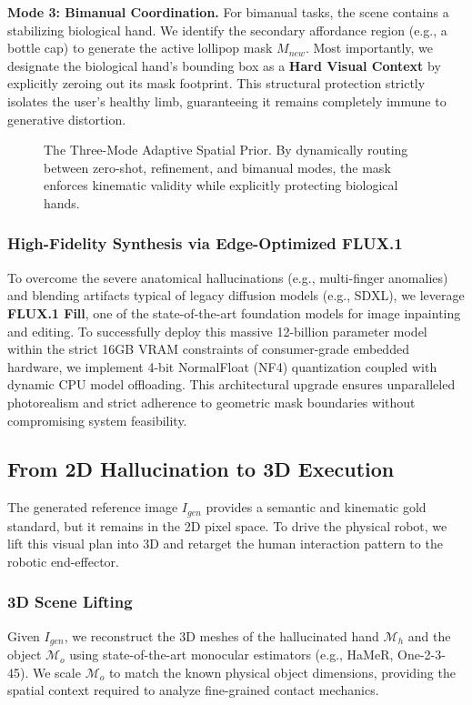 \documentclass[letterpaper, 10 pt, conference]{ieeeconf}  %
\begin{document}
\textbf{Mode 3: Bimanual Coordination.} 
For bimanual tasks, the scene contains a stabilizing biological hand. We identify the secondary affordance region (e.g., a bottle cap) to generate the active lollipop mask $M_{new}$. Most importantly, we designate the biological hand's bounding box as a \textbf{Hard Visual Context} by explicitly zeroing out its mask footprint. This structural protection strictly isolates the user's healthy limb, guaranteeing it remains completely immune to generative distortion.

\begin{figure}[t]
    \centering
    \caption{The Three-Mode Adaptive Spatial Prior. By dynamically routing between zero-shot, refinement, and bimanual modes, the mask enforces kinematic validity while explicitly protecting biological hands.}
    \label{fig:mask_generation}
\end{figure}

\subsubsection{High-Fidelity Synthesis via Edge-Optimized FLUX.1}
To overcome the severe anatomical hallucinations (e.g., multi-finger anomalies) and blending artifacts typical of legacy diffusion models (e.g., SDXL), we leverage \textbf{FLUX.1 Fill}, one of the state-of-the-art foundation models for image inpainting and editing. To successfully deploy this massive 12-billion parameter model within the strict 16GB VRAM constraints of consumer-grade embedded hardware, we implement 4-bit NormalFloat (NF4) quantization coupled with dynamic CPU model offloading. This architectural upgrade ensures unparalleled photorealism and strict adherence to geometric mask boundaries without compromising system feasibility.

\subsection{From 2D Hallucination to 3D Execution}
\label{subsec:retargeting}

The generated reference image $I_{gen}$ provides a semantic and kinematic gold standard, but it remains in the 2D pixel space. To drive the physical robot, we lift this visual plan into 3D and retarget the human interaction pattern to the robotic end-effector.

\subsubsection{3D Scene Lifting}
Given $I_{gen}$, we reconstruct the 3D meshes of the hallucinated hand $\mathcal{M}_h$ and the object $\mathcal{M}_o$ using state-of-the-art monocular estimators (e.g., HaMeR, One-2-3-45). We scale $\mathcal{M}_o$ to match the known physical object dimensions, providing the spatial context required to analyze fine-grained contact mechanics.
\end{document}

